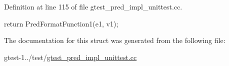 \-Definition at line 115 of file gtest\-\_\-pred\-\_\-impl\-\_\-unittest.\-cc.


\begin{DoxyCode}
                                                          {
    return PredFormatFunction1(e1, v1);
  }
\end{DoxyCode}


\-The documentation for this struct was generated from the following file\-:\begin{DoxyCompactItemize}
\item 
gtest-\/1../test/\hyperlink{gtest__pred__impl__unittest_8cc}{gtest\-\_\-pred\-\_\-impl\-\_\-unittest.\-cc}\end{DoxyCompactItemize}
